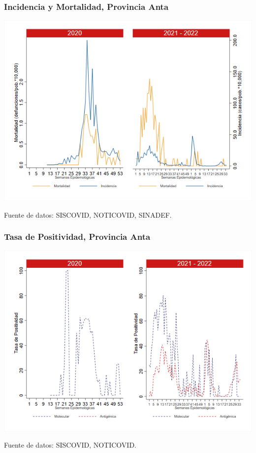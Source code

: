 \documentclass[xcolor=table]{beamer}
\begin{document}
\begin{frame}[label=Anta]
	\frametitle{Incidencia y Mortalidad, Provincia Anta}
	\vspace{-.5cm}
	\begin{center}
		\includegraphics[width=0.8\linewidth, trim={0cm .5cm 0cm 0.2cm},clip]{../figuras/incidencia_mortalidad_20_21_2.png}
	\end{center}
	{\tiny Fuente de datos: SISCOVID, NOTICOVID, SINADEF.}
\end{frame}

\begin{frame}
	\frametitle{Tasa de Positividad, Provincia Anta}
	\vspace{-.5cm}
	\begin{center}
		\includegraphics[width=0.8\linewidth, trim={0cm .5cm 0cm 0.2cm},clip]{../figuras/positividad_20_21_2.png}
	\end{center}
	{\tiny Fuente de datos: SISCOVID, NOTICOVID.}
\end{frame}
\end{document}
